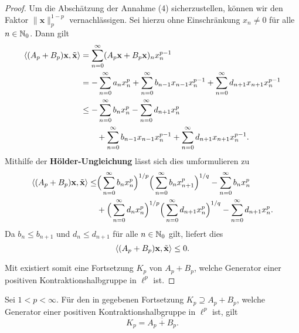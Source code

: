 \begin{proof}
\newpage
\par 
Um die Abschätzung der Annahme (4) sicherzustellen, können wir den  Faktor $\|\textbf{x}\|_p^{1-p}$ vernachlässigen. 
Sei hierzu ohne Einschränkung $x_n\neq 0$ für alle $n\in\mathbb{N}_0$. Dann gilt
\begin{align*}
\langle (A_p+B_p)\textnormal{\textbf{x}}, \tilde{\textnormal{\textbf{x}}}\rangle
&= \sum_{n=0}^\infty (A_p\textnormal{\textbf{x}}+B_p\textnormal{\textbf{x}})_n x_n^{p-1}\\
&= -\sum_{n=0}^\infty a_n x_n^{p} + \sum_{n=0}^\infty b_{n-1} x_{n-1} x_n^{p-1} + \sum_{n=0}^\infty d_{n+1} x_{n+1}x_n^{p-1}\\
&\leq -\sum_{n=0}^\infty b_n x_n^p - \sum_{n=0}^\infty d_{n+1}x_n^p \\
&\quad\quad +\sum_{n=0}^\infty b_{n-1} x_{n-1} x_n^{p-1} + \sum_{n=0}^\infty d_{n+1}x_{n+1} x_n^{p-1}.
\end{align*}
Mithilfe der \index{}\textbf{Hölder-Ungleichung} lässt sich dies umformulieren zu
\begin{align*}
\langle (A_p+B_p)\textnormal{\textbf{x}}, \tilde{\textbf{x}}\rangle 
\leq &\Big(\sum_{n=0}^\infty b_n x_n^p\Big)^{1/p}\Big(\sum_{n=0}^\infty b_n x_{n+1}^p\Big)^{1/q} - \sum_{n=0}^\infty b_n x_n^p\\
& + \Big(\sum_{n=0}^\infty d_n x_n^p \Big)^{1/p}\Big(\sum_{n=0}^\infty d_{n+1}x_n^p\Big)^{1/q} - \sum_{n=0}^\infty d_{n+1} x_n^p.
\end{align*}
Da $b_n\leq b_{n+1}$ und  $d_n\leq d_{n+1}$  für alle $n\in\mathbb{N}_0$ gilt, liefert dies
\begin{equation*}
    \langle (A_p+B_p)\textnormal{\textbf{x}}, \tilde{\textnormal{\textbf{x}}}\rangle \leq 0.
\end{equation*}

Mit  existiert somit eine Fortsetzung $K_p$ von $A_p + B_p$, welche Generator einer positiven Kontraktionshalbgruppe in $\ell^p$ ist.
\end{proof}




\begin{folg}\label{Charakterisierung des Generators eines GTP}
Sei $1<p<\infty$. Für den in   gegebenen Fortsetzung $K_p\supseteq A_p+B_p$, welche Generator einer positiven Kontraktionshalbgruppe in $\ell^p$ ist, gilt 
\begin{equation*}
     K_p=\overline{A_p + B_p}.
\end{equation*}
\end{folg}




